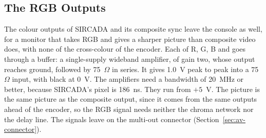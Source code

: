 \subsection{The RGB Outputs}
\label{sec:rgb-wiring}

The colour outputs of SIRCADA and its composite sync leave the console as well, for a monitor that takes RGB and gives
a sharper picture than composite video does, with none of the cross-colour of the encoder. Each of R, G, B and
 goes through a buffer: a single-supply wideband amplifier, of gain two, whose output reaches ground,
followed by 75~$\Omega$ in series. It gives 1.0~V peak to peak into a 75~$\Omega$ input, with black at 0~V. The
amplifiers need a bandwidth of 20~MHz or better, because SIRCADA's pixel is 186~ns. They run from $+5$~V. The picture
is the same picture as the composite output, since it comes from the same outputs ahead of the encoder, so the RGB
signal needs neither the chroma network nor the delay line. The signals leave on the multi-out connector
(Section~\ref{sec:av-connector}).

